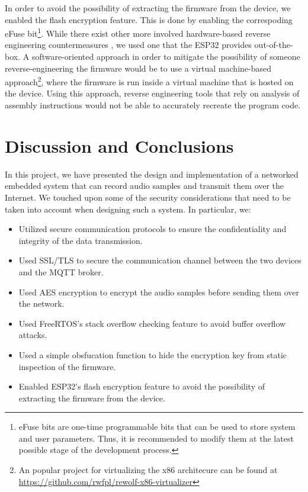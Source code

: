 \documentclass[conference]{IEEEtran}
\begin{document}
In order to avoid the possibility of extracting the firmware from the device,
we enabled the flash encryption feature. This is done by enabling the
correspoding eFuse bit\footnote{eFuse bits are one-time programmable bits that
can be used to store system and user parameters. Thus, it is recommended to
modify them at the latest possible stage of the development process.}. While
there exist other more involved hardware-based reverse engineering
countermeasures \cite{HardwareReverseEngineering}, we used one that the ESP32
provides out-of-the-box.
A software-oriented approach in order to mitigate the possibility of someone reverse-engineering the firmware would be to use
a virtual machine-based approach\footnote{An popular project for virtualizing the x86 architecure can be found at \url{https://github.com/rwfpl/rewolf-x86-virtualizer}},
where the firmware is run inside a virtual machine that is hosted on the device.
Using this approach, reverse engineering tools that rely on analysis of
assembly instructions would not be able to accurately recreate the program
code.


\section{Discussion and Conclusions}
\label{sec:discussion_and_conclusions}

In this project, we have presented the design and implementation of a networked embedded system
that can record audio samples and transmit them over the Internet.
We touched upon some of the security considerations that need to be taken into account when designing such a system.
In particular, we:

\begin{itemize}
    \item Utilized secure communication protocols to ensure the confidentiality and integrity of the data transmission.
    \item Used SSL/TLS to secure the communication channel between the two devices and the MQTT broker.
    \item Used AES encryption to encrypt the audio samples before sending them over the network.
    \item Used FreeRTOS's stack overflow checking feature to avoid buffer overflow attacks.
    \item Used a simple obsfucation function to hide the encryption key from static inspection of the firmware.
    \item Enabled ESP32's flash encryption feature to avoid the possibility of extracting the firmware from the device.
\end{itemize}
\end{document}
